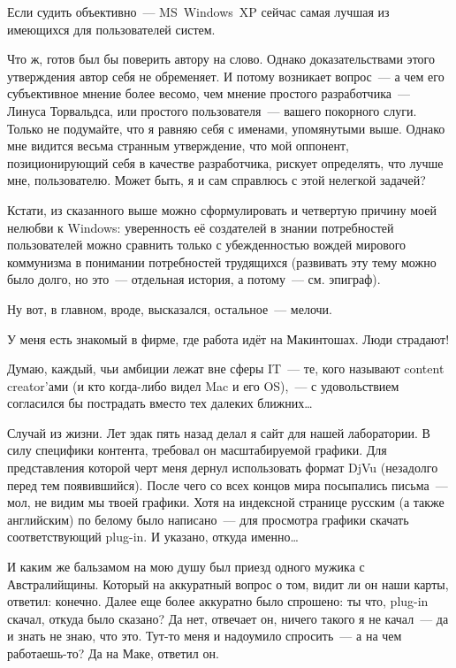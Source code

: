 \begin{shadequote}{}
Если судить объективно~--- MS~Windows~XP сейчас самая лучшая из имеющихся для пользователей систем.  
\end{shadequote}

Что ж, готов был бы поверить автору на слово. Однако доказательствами этого утверждения автор себя не обременяет. И потому возникает вопрос~--- а чем его субъективное мнение более весомо, чем мнение простого разработчика~--- Линуса Торвальдса, или простого пользователя~--- вашего покорного слуги. Только не подумайте, что я равняю себя с именами, упомянутыми выше. Однако мне видится весьма странным утверждение, что мой оппонент, позиционирующий себя в качестве разработчика, рискует определять, что лучше мне, пользователю. Может быть, я и сам справлюсь с этой нелегкой задачей?

Кстати, из сказанного выше можно сформулировать и четвертую причину моей нелюбви к Windows: уверенность её создателей в знании потребностей пользователей можно сравнить только с убежденностью вождей мирового коммунизма в понимании потребностей трудящихся (развивать эту тему можно было долго, но это~--- отдельная история, а потому~--- см. эпиграф).

Ну вот, в главном, вроде, высказался, остальное~--- мелочи.


\begin{shadequote}{}
У меня есть знакомый в фирме, где работа идёт на Макинтошах. Люди страдают!  
\end{shadequote}

Думаю, каждый, чьи амбиции лежат вне сферы IT~--- те, кого называют content creator'ами (и кто когда-либо видел Mac и его OS),~--- с удовольствием согласился бы пострадать вместо тех далеких ближних\dots

Случай из жизни. Лет эдак пять назад делал я сайт для нашей лаборатории. В силу специфики контента, требовал он масштабируемой графики. Для представления которой черт меня дернул использовать формат DjVu (незадолго перед тем появившийся). После чего со всех концов мира посыпались письма~--- мол, не видим мы твоей графики. Хотя на индексной странице русским (а также английским) по белому было написано~--- для просмотра графики скачать соответствующий plug-in. И указано, откуда именно\dots

И каким же бальзамом на мою душу был приезд одного мужика с Австралийщины. Который на аккуратный вопрос о том, видит ли он наши карты, ответил: конечно. Далее еще более аккуратно было спрошено: ты что, plug-in скачал, откуда было сказано? Да нет, отвечает он, ничего такого я не качал~--- да и знать не знаю, что это. Тут-то меня и надоумило спросить~--- а на чем работаешь-то? Да на Маке, ответил он.

